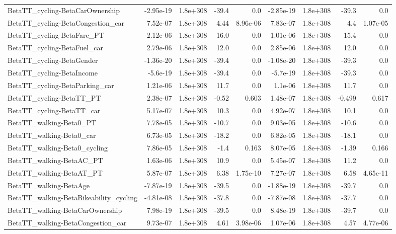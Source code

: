 \begin{tabular}{lrrrrrrrr}
BetaTT_cycling-BetaCarOwnership & -2.95e-19 & 1.8e+308 & -39.4 & 0.0 & -2.85e-19 & 1.8e+308 & -39.3 & 0.0 \\
BetaTT_cycling-BetaCongestion_car & 7.52e-07 & 1.8e+308 & 4.44 & 8.96e-06 & 7.83e-07 & 1.8e+308 & 4.4 & 1.07e-05 \\
BetaTT_cycling-BetaFare_PT & 2.12e-06 & 1.8e+308 & 16.0 & 0.0 & 1.01e-06 & 1.8e+308 & 15.4 & 0.0 \\
BetaTT_cycling-BetaFuel_car & 2.79e-06 & 1.8e+308 & 12.0 & 0.0 & 2.85e-06 & 1.8e+308 & 12.0 & 0.0 \\
BetaTT_cycling-BetaGender & -1.36e-20 & 1.8e+308 & -39.4 & 0.0 & -1.08e-20 & 1.8e+308 & -39.3 & 0.0 \\
BetaTT_cycling-BetaIncome & -5.6e-19 & 1.8e+308 & -39.4 & 0.0 & -5.7e-19 & 1.8e+308 & -39.3 & 0.0 \\
BetaTT_cycling-BetaParking_car & 1.21e-06 & 1.8e+308 & 11.7 & 0.0 & 1.1e-06 & 1.8e+308 & 11.7 & 0.0 \\
BetaTT_cycling-BetaTT_PT & 2.38e-07 & 1.8e+308 & -0.52 & 0.603 & 1.48e-07 & 1.8e+308 & -0.499 & 0.617 \\
BetaTT_cycling-BetaTT_car & 5.17e-07 & 1.8e+308 & 10.3 & 0.0 & 4.92e-07 & 1.8e+308 & 10.1 & 0.0 \\
BetaTT_walking-Beta0_PT & 7.78e-05 & 1.8e+308 & -10.7 & 0.0 & 9.03e-05 & 1.8e+308 & -10.6 & 0.0 \\
BetaTT_walking-Beta0_car & 6.73e-05 & 1.8e+308 & -18.2 & 0.0 & 6.82e-05 & 1.8e+308 & -18.1 & 0.0 \\
BetaTT_walking-Beta0_cycling & 7.86e-05 & 1.8e+308 & -1.4 & 0.163 & 8.07e-05 & 1.8e+308 & -1.39 & 0.166 \\
BetaTT_walking-BetaAC_PT & 1.63e-06 & 1.8e+308 & 10.9 & 0.0 & 5.45e-07 & 1.8e+308 & 11.2 & 0.0 \\
BetaTT_walking-BetaAT_PT & 5.87e-07 & 1.8e+308 & 6.38 & 1.75e-10 & 7.27e-07 & 1.8e+308 & 6.58 & 4.65e-11 \\
BetaTT_walking-BetaAge & -7.87e-19 & 1.8e+308 & -39.5 & 0.0 & -1.88e-19 & 1.8e+308 & -39.7 & 0.0 \\
BetaTT_walking-BetaBikeability_cycling & -4.81e-08 & 1.8e+308 & -37.8 & 0.0 & -7.87e-08 & 1.8e+308 & -37.7 & 0.0 \\
BetaTT_walking-BetaCarOwnership & 7.98e-19 & 1.8e+308 & -39.5 & 0.0 & 8.48e-19 & 1.8e+308 & -39.7 & 0.0 \\
BetaTT_walking-BetaCongestion_car & 9.73e-07 & 1.8e+308 & 4.61 & 3.98e-06 & 1.07e-06 & 1.8e+308 & 4.57 & 4.77e-06 \\

\end{tabular}
